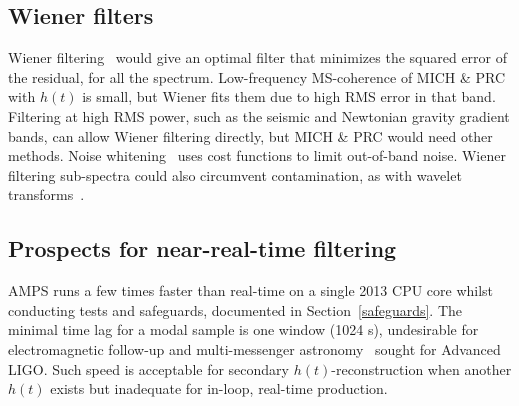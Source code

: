 
        \subsection{Wiener filters}
        \label{wiener_filters}

            Wiener filtering~\cite{Wiener1949} would give an optimal filter that minimizes the squared error of the residual, for all the spectrum. Low-frequency MS-coherence of MICH \& PRC with $h(t)$ is small, but Wiener fits them due to high RMS error in that band. Filtering at high RMS power, such as the seismic and Newtonian gravity gradient bands, can allow Wiener filtering directly, but MICH \& PRC would need other methods. Noise whitening~\cite{Driggers2012NN,DeRosa2012FF} uses cost functions to limit out-of-band noise. Wiener filtering sub-spectra could also circumvent contamination, as with wavelet transforms~\cite{KlimenkoSite}.  



        \subsection{Prospects for near-real-time filtering}
        \label{real-time}
      
            AMPS runs a few times faster than real-time on a single 2013 CPU core whilst conducting tests and safeguards, documented in Section~\ref{safeguards}. 
The minimal time lag for a modal sample is one window (1024 s), undesirable for electromagnetic follow-up and multi-messenger astronomy~\cite{Swift2012,Antares2013} sought for Advanced LIGO. 
Such speed is acceptable for secondary $h(t)$-reconstruction when another $h(t)$ exists but inadequate for in-loop, real-time production. 

